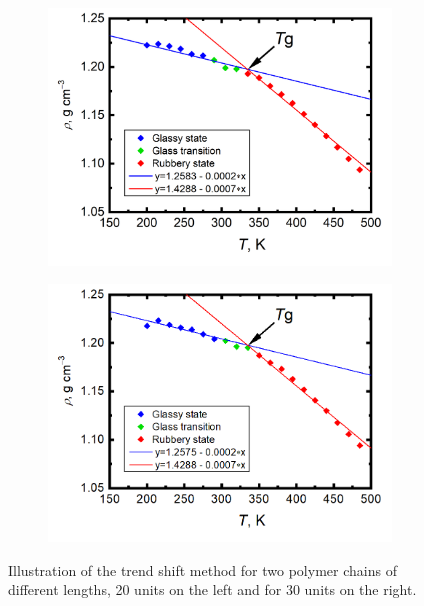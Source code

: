 \begin{figure}[H]
	\begin{subfigure}{0.5\textwidth}
		\includegraphics[width=1.0\linewidth]{img/vypocet_tg.png} 
	\end{subfigure}
	\begin{subfigure}{0.5\textwidth}
		\includegraphics[width=1.0\linewidth]{img/tg_ukazka_30.png} 
	\end{subfigure}   	
	\vspace{-1cm}
	\caption{Illustration of the trend shift method for two polymer chains of different lengths, 20 units on the left and for 30 units on the right.}
	\label{fig:illust}
\end{figure}

